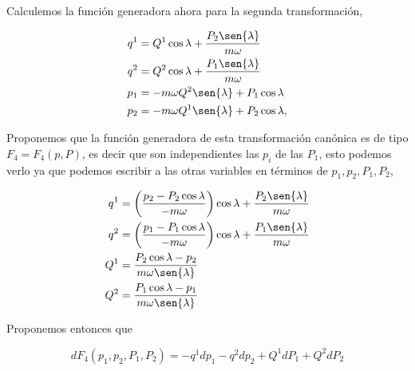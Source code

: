 \documentclass[a4paper,10pt]{article}
\numberwithin{equation}{section}
\begin{document}
\vspace{.3cm}

Calculemos la función generadora ahora para la segunda transformación, 

\begin{align*}
 q^1 &= Q^1\cos{\lambda} + \frac{P_2\sen{\lambda}}{m\omega} \\
 q^2 &= Q^2\cos{\lambda} + \frac{P_1\sen{\lambda}}{m\omega}\\
 p_1 &= - m\omega Q^2\sen{\lambda} + P_1 \cos{\lambda}\\
 p_2 &= - m\omega Q^1\sen{\lambda} + P_2 \cos{\lambda},
\end{align*}

Proponemos que la función generadora de esta transformación canónica es de tipo 
$F_4 = F_4(p,P)$, es decir que son independientes las $p_i$ de las $P_1$, esto podemos 
verlo ya que podemos escribir a las otras variables en términos de $p_1,p_2,P_1,P_2$, 

\begin{align*}
 q^1 &= \left( \frac{p_2 - P_2\cos{\lambda}}{-m\omega}\right)\cos{\lambda} 
 + \frac{P_2\sen{\lambda}}{m\omega} \\
 q^2 &= \left(\frac{p_1 - P_1\cos{\lambda}}{-m\omega}\right)\cos{\lambda} 
 + \frac{P_1\sen{\lambda}}{m\omega} \\
 Q^1 &= \frac{P_2\cos{\lambda} - p_2}{m\omega\sen{\lambda}}\\
 Q^2 &= \frac{P_1\cos{\lambda} - p_1}{m\omega\sen{\lambda}}
\end{align*}

Proponemos entonces que 

\begin{equation}
 dF_4(p_1,p_2,P_1,P_2) = -q^1dp_1 - q^2dp_2 + Q^1dP_1 + Q^2dP_2 
\end{equation}
\end{document}
